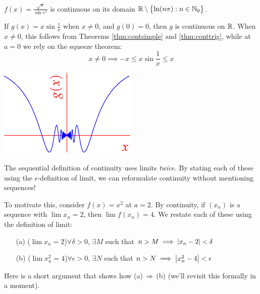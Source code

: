 \begin{examples}{}{}
	\exstart $f(x)=\frac{\sqrt x}{\sin e^x}$ is continuous on its domain $\mathbb{R}\setminus\bigl\{\ln(n\pi):n\in\mathbb{N}_0\bigr\}$.
	\begin{enumerate}\setcounter{enumi}{1}
		\begin{minipage}[t]{0.70\linewidth}\vspace{-5pt}
			\item If $g(x)=x\sin\frac 1x$ when $x\neq 0$, and $g(0)=0$, then $g$ is continuous on $\mathbb{R}$. When $x\neq 0$, this follows from Theorems \ref{thm:contsimple} and \ref{thm:conttrig}, while at $a=0$ we rely on the squeeze theorem:
			\[
				x\neq 0\implies -x\le x\sin\frac 1x\le x
			\]
		\end{minipage}
		\hfill
		\begin{minipage}[t]{0.29\linewidth}\vspace{-5pt}
			\flushright\includegraphics[scale=0.95]{cont-ex1}
		\end{minipage}
	\end{enumerate}
\end{examples}


\label{ex:easycont2}

The sequential definition of continuity uses limits \emph{twice.} By stating each of these using the $\epsilon$-definition of limit, we can reformulate continuity without mentioning sequences!\smallbreak

To motivate this, consider $f(x)=x^2$ at $a=2$. By continuity, if $(x_n)$ is a sequence with $\lim x_n=2$, then $\lim f(x_n)=4$. We restate each of these using the definition of limit:
	\begin{itemize}
	  \item[(a)] ($\lim x_n=2$)\quad $\forall\delta>0$, $\exists M$ such that $n>M\implies \left| x_n-2\right|<\delta$
	  \item[(b)] ($\lim x_n^2=4$)\quad $\forall\epsilon>0$, $\exists N$ such that $n>N\implies \left| x_n^2-4\right|<\epsilon$
	\end{itemize}
	Here is a short argument that shows how (a)\,$\Rightarrow$\,(b) (we'll revisit this formally in a moment).
	
